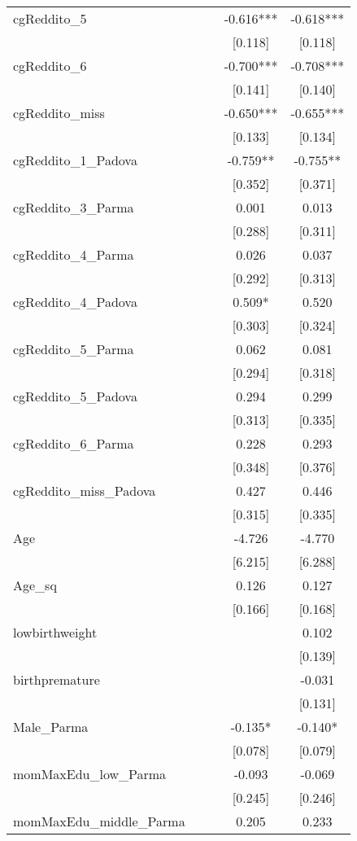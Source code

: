 \documentclass[]{article}
\begin{document}
\begin{tabular}{lcccc}
cgReddito\_5 &  &  & -0.616*** & -0.618*** \\
 &  &  & [0.118] & [0.118] \\
cgReddito\_6 &  &  & -0.700*** & -0.708*** \\
 &  &  & [0.141] & [0.140] \\
cgReddito\_miss &  &  & -0.650*** & -0.655*** \\
 &  &  & [0.133] & [0.134] \\
cgReddito\_1\_Padova &  &  & -0.759** & -0.755** \\
 &  &  & [0.352] & [0.371] \\
cgReddito\_3\_Parma &  &  & 0.001 & 0.013 \\
 &  &  & [0.288] & [0.311] \\
cgReddito\_4\_Parma &  &  & 0.026 & 0.037 \\
 &  &  & [0.292] & [0.313] \\
cgReddito\_4\_Padova &  &  & 0.509* & 0.520 \\
 &  &  & [0.303] & [0.324] \\
cgReddito\_5\_Parma &  &  & 0.062 & 0.081 \\
 &  &  & [0.294] & [0.318] \\
cgReddito\_5\_Padova &  &  & 0.294 & 0.299 \\
 &  &  & [0.313] & [0.335] \\
cgReddito\_6\_Parma &  &  & 0.228 & 0.293 \\
 &  &  & [0.348] & [0.376] \\
cgReddito\_miss\_Padova &  &  & 0.427 & 0.446 \\
 &  &  & [0.315] & [0.335] \\
Age &  &  & -4.726 & -4.770 \\
 &  &  & [6.215] & [6.288] \\
Age\_sq &  &  & 0.126 & 0.127 \\
 &  &  & [0.166] & [0.168] \\
lowbirthweight &  &  &  & 0.102 \\
 &  &  &  & [0.139] \\
birthpremature &  &  &  & -0.031 \\
 &  &  &  & [0.131] \\
Male\_Parma &  &  & -0.135* & -0.140* \\
 &  &  & [0.078] & [0.079] \\
momMaxEdu\_low\_Parma &  &  & -0.093 & -0.069 \\
 &  &  & [0.245] & [0.246] \\
momMaxEdu\_middle\_Parma &  &  & 0.205 & 0.233 \\

\end{tabular}
\end{document}
